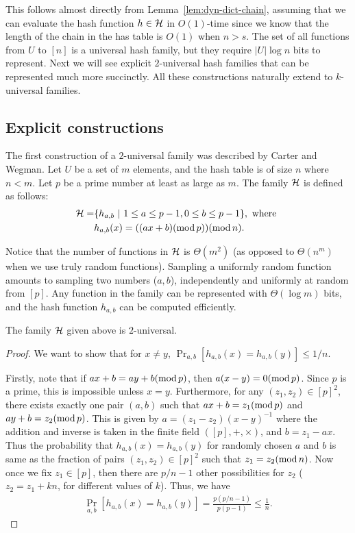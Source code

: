 This follows almost directly from Lemma~\ref{lem:dyn-dict-chain}, assuming that
we can evaluate the hash function $h\in {\cal H}$ in $O(1)$-time since we know
that the length of the chain in the has table is $O(1)$ when $n > s$. The set of
all functions from $U$ to $[n]$ is a universal hash family, but they require
$|U|\log n$ bits to represent. Next we will see explicit $2$-universal hash
families that can be represented much more succinctly. All these constructions
naturally extend to $k$-universal families.

\subsection{Explicit constructions}

The first construction of a $2$-universal family was described by Carter and
Wegman. Let $U$ be a set of $m$ elements, and the hash table is of size $n$
where $n < m$. Let $p$ be a prime number at least as large as $m$. The family ${\cal H}$ is defined as follows:
\begin{align*}
  {\cal H} = &\{ h_{a,b} ~|~ 1\leq a \leq p-1, 0\leq b\leq p-1 \}, \text{ where }\\
  &h_{a,b}(x) = ((ax + b) (\operatorname{mod} p)) (\operatorname{mod} n).
\end{align*}

Notice that the number of functions in ${\cal H}$ is $\Theta(m^2)$ (as opposed
to $\Theta(n^m)$ when we use truly random functions). Sampling a uniformly
random function amounts to sampling two numbers ($a,b$), independently and
uniformly at random from $[p]$. Any function in the family can be represented
with $\Theta(\log m)$ bits, and the hash function $h_{a,b}$ can be computed
efficiently.

\begin{theorem}
  The family ${\cal H}$ given above is $2$-universal.
  \label{thm:2-univ}
\end{theorem}
\begin{proof}
  We want to show that for $x\neq y$,
  $\Pr_{a,b} [h_{a,b}(x) = h_{a,b}(y)] \leq 1/n$.

  Firstly, note that if $ax+b = ay+b (\operatorname{mod} p)$, then $a(x-y) = 0 (\operatorname{mod}
  p)$. Since $p$ is a prime, this is impossible unless $x=y$. Furthermore, for any
  $(z_1, z_2)\in [p]^2$, there exists exactly one pair $(a,b)$ such that
  $ax+b = z_1 (\operatorname{mod} p)$ and $ay+b=z_2 (\operatorname{mod} p)$. This is given by
  $a = (z_1 - z_2)(x-y)^{-1}$ where the addition and inverse is taken in the
  finite field $([p],+,\times)$, and $b =z_1 - ax$. Thus the probability that
  $h_{a,b}(x) = h_{a,b}(y)$ for randomly chosen $a$ and $b$ is same as the
  fraction of pairs $(z_1, z_2)\in [p]^2$ such that $z_1 = z_2 (\operatorname{mod} n)$.  Now
  once we fix $z_1 \in [p]$, then there are $p/n - 1$ other possibilities for
  $z_2$ ($z_2 = z_1 + kn$, for different values of $k$). Thus, we have
  \begin{align*}
    \Pr_{a,b} [h_{a,b}(x) = h_{a,b}(y)] = \frac{p(p/n - 1)}{p(p-1)}\leq \frac{1}{n}.
  \end{align*}
\end{proof}

